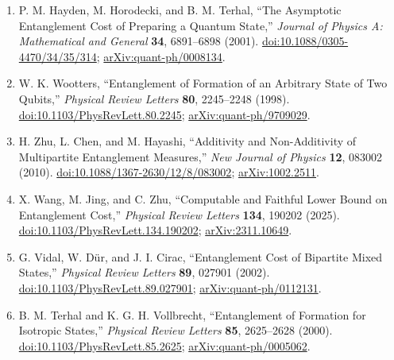 \begin{enumerate}[label={},leftmargin=4.8em,labelsep=0.5em]
  \footnotesize
  \item[\textup{[HHT01]}]\label{ref:p7-hayden-horodecki-terhal}
  P. M. Hayden, M. Horodecki, and B. M. Terhal,
  ``The Asymptotic Entanglement Cost of Preparing a Quantum State,''
  \emph{Journal of Physics A: Mathematical and General} \textbf{34},
  6891--6898 (2001).
  \href{https://doi.org/10.1088/0305-4470/34/35/314}%
       {doi:10.1088/0305-4470/34/35/314};
  \href{https://arxiv.org/abs/quant-ph/0008134}{arXiv:quant-ph/0008134}.

  \item[\textup{[Woo98]}]\label{ref:p7-wootters}
  W. K. Wootters,
  ``Entanglement of Formation of an Arbitrary State of Two Qubits,''
  \emph{Physical Review Letters} \textbf{80}, 2245--2248 (1998).
  \href{https://doi.org/10.1103/PhysRevLett.80.2245}%
       {doi:10.1103/PhysRevLett.80.2245};
  \href{https://arxiv.org/abs/quant-ph/9709029}{arXiv:quant-ph/9709029}.

  \item[\textup{[ZCH10]}]\label{ref:p7-zhu-chen-hayashi}
  H. Zhu, L. Chen, and M. Hayashi,
  ``Additivity and Non-Additivity of Multipartite Entanglement Measures,''
  \emph{New Journal of Physics} \textbf{12}, 083002 (2010).
  \href{https://doi.org/10.1088/1367-2630/12/8/083002}%
       {doi:10.1088/1367-2630/12/8/083002};
  \href{https://arxiv.org/abs/1002.2511}{arXiv:1002.2511}.

  \item[\textup{[WJZ25]}]\label{ref:p7-wang-jing-zhu}
  X. Wang, M. Jing, and C. Zhu,
  ``Computable and Faithful Lower Bound on Entanglement Cost,''
  \emph{Physical Review Letters} \textbf{134}, 190202 (2025).
  \href{https://doi.org/10.1103/PhysRevLett.134.190202}%
       {doi:10.1103/PhysRevLett.134.190202};
  \href{https://arxiv.org/abs/2311.10649}{arXiv:2311.10649}.

  \item[\textup{[VDC02]}]\label{ref:p7-vidal-dur-cirac}
  G. Vidal, W. D\"ur, and J. I. Cirac,
  ``Entanglement Cost of Bipartite Mixed States,''
  \emph{Physical Review Letters} \textbf{89}, 027901 (2002).
  \href{https://doi.org/10.1103/PhysRevLett.89.027901}%
       {doi:10.1103/PhysRevLett.89.027901};
  \href{https://arxiv.org/abs/quant-ph/0112131}{arXiv:quant-ph/0112131}.

  \item[\textup{[TV00]}]\label{ref:p7-terhal-vollbrecht}
  B. M. Terhal and K. G. H. Vollbrecht,
  ``Entanglement of Formation for Isotropic States,''
  \emph{Physical Review Letters} \textbf{85}, 2625--2628 (2000).
  \href{https://doi.org/10.1103/PhysRevLett.85.2625}%
       {doi:10.1103/PhysRevLett.85.2625};
  \href{https://arxiv.org/abs/quant-ph/0005062}{arXiv:quant-ph/0005062}.
\end{enumerate}

